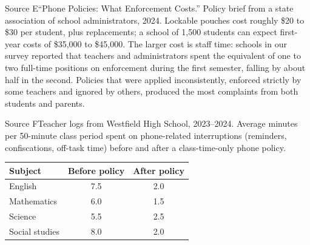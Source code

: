 \documentclass[11pt]{article}
\begin{document}
\begin{source}{Source E}{``Phone Policies: What Enforcement Costs.'' Policy brief from a state association of school administrators, 2024.}
Lockable pouches cost roughly \$20 to \$30 per student, plus replacements; a school of 1,500 students can expect first-year costs of \$35,000 to \$45,000. The larger cost is staff time: schools in our survey reported that teachers and administrators spent the equivalent of one to two full-time positions on enforcement during the first semester, falling by about half in the second. Policies that were applied inconsistently, enforced strictly by some teachers and ignored by others, produced the most complaints from both students and parents.
\end{source}

\begin{source}{Source F}{Teacher logs from Westfield High School, 2023--2024. Average minutes per 50-minute class period spent on phone-related interruptions (reminders, confiscations, off-task time) before and after a class-time-only phone policy.}
\begin{center}\small
\begin{tabular}{lcc}
\toprule
Subject & Before policy & After policy \\
\midrule
English & 7.5 & 2.0 \\
Mathematics & 6.0 & 1.5 \\
Science & 5.5 & 2.5 \\
Social studies & 8.0 & 2.0 \\
\bottomrule
\end{tabular}
\end{center}
\end{source}

\makekey
\end{document}
